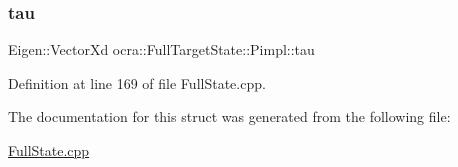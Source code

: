\hypertarget{structocra_1_1FullTargetState_1_1Pimpl_aae33a52895f1ead1be869d88b3e6ff9f}{}\label{structocra_1_1FullTargetState_1_1Pimpl_aae33a52895f1ead1be869d88b3e6ff9f} 
\subsubsection{\texorpdfstring{tau}{tau}}
{\footnotesize\ttfamily Eigen\+::\+Vector\+Xd ocra\+::\+Full\+Target\+State\+::\+Pimpl\+::tau}



Definition at line 169 of file Full\+State.\+cpp.



The documentation for this struct was generated from the following file\+:\begin{DoxyCompactItemize}
\item 
\hyperlink{FullState_8cpp}{Full\+State.\+cpp}\end{DoxyCompactItemize}

